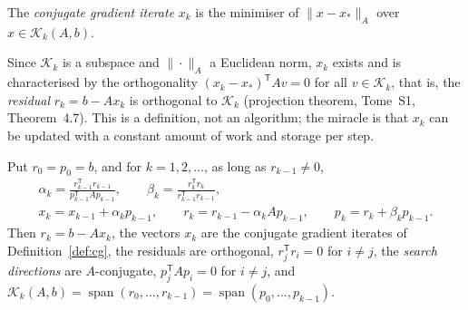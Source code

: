 \begin{definition}\label{def:cg}
The \emph{conjugate gradient iterate} $x_k$ is the minimiser of $\|x-x_*\|_A$ over $x\in\mathcal K_k(A,b)$.
\end{definition}

Since $\mathcal K_k$ is a subspace and $\|\cdot\|_A$ a Euclidean norm, $x_k$ exists and is characterised by the orthogonality $(x_k-x_*)^{\mathsf T}Av=0$ for all
$v\in\mathcal K_k$, that is, the \emph{residual} $r_k=b-Ax_k$ is orthogonal to $\mathcal K_k$ (projection theorem, Tome~S1, Theorem~4.7). This is a definition,
not an algorithm; the miracle is that $x_k$ can be updated with a constant amount of work and storage per step.

\begin{theorem}\label{thm:cg}
Put $r_0=p_0=b$, and for $k=1,2,\dots$, as long as $r_{k-1}\ne0$,
\[
\begin{gathered}
\alpha_k=\frac{r_{k-1}^{\mathsf T}r_{k-1}}{p_{k-1}^{\mathsf T}Ap_{k-1}},\qquad\beta_k=\frac{r_k^{\mathsf T}r_k}{r_{k-1}^{\mathsf T}r_{k-1}},\\
x_k=x_{k-1}+\alpha_kp_{k-1},\qquad r_k=r_{k-1}-\alpha_kAp_{k-1},\qquad p_k=r_k+\beta_kp_{k-1}.
\end{gathered}
\]
Then $r_k=b-Ax_k$, the vectors $x_k$ are the conjugate gradient iterates of Definition~\ref{def:cg}, the residuals are orthogonal, $r_j^{\mathsf T}r_i=0$ for $i\ne j$, the
\emph{search directions} are $A$-conjugate, $p_j^{\mathsf T}Ap_i=0$ for $i\ne j$, and
$\mathcal K_k(A,b)=\operatorname{span}(r_0,\dots,r_{k-1})=\operatorname{span}(p_0,\dots,p_{k-1})$.
\end{theorem}

